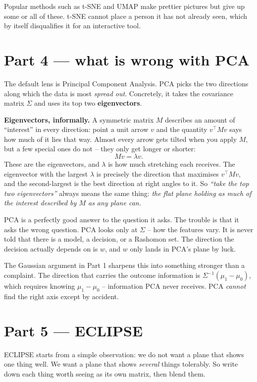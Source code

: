 \documentclass[11pt]{article}
\begin{document}
Popular methods such as t-SNE and UMAP make prettier pictures but give up some or all
of these. t-SNE cannot place a person it has not already seen, which by itself
disqualifies it for an interactive tool.

\section{Part 4 --- what is wrong with PCA}

The default lens is Principal Component Analysis. PCA picks the two directions along
which the data is most \emph{spread out}. Concretely, it takes the covariance matrix
$\Sigma$ and uses its top two \textbf{eigenvectors}.

\begin{keybox}
\textbf{Eigenvectors, informally.} A symmetric matrix $M$ describes an amount of
``interest'' in every direction: point a unit arrow $v$ and the quantity $v^\top M v$
says how much of it lies that way. Almost every arrow gets tilted when you apply $M$,
but a few special ones do not -- they only get longer or shorter:
\[
  M v = \lambda v .
\]
These are the eigenvectors, and $\lambda$ is how much stretching each receives. The
eigenvector with the largest $\lambda$ is precisely the direction that maximises
$v^\top M v$, and the second-largest is the best direction at right angles to it. So
\emph{``take the top two eigenvectors''} always means the same thing: \emph{the flat
plane holding as much of the interest described by $M$ as any plane can.}
\end{keybox}

PCA is a perfectly good answer to the question it asks. The trouble is that it asks the
wrong question. PCA looks only at $\Sigma$ -- how the features vary. It is never told
that there is a model, a decision, or a Rashomon set. The direction the decision
actually depends on is $w$, and $w$ only lands in PCA's plane by luck.

The Gaussian argument in Part 1 sharpens this into something stronger than a
complaint. The direction that carries the outcome information is
$\Sigma^{-1}(\mu_1-\mu_0)$, which requires knowing $\mu_1 - \mu_0$ -- information PCA
never receives. PCA \emph{cannot} find the right axis except by accident.

\section{Part 5 --- ECLIPSE}

ECLIPSE starts from a simple observation: we do not want a plane that shows one thing
well. We want a plane that shows \emph{several} things tolerably. So write down each
thing worth seeing as its own matrix, then blend them.
\end{document}
